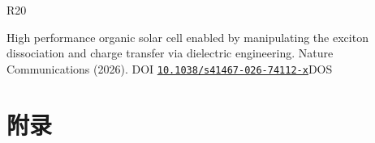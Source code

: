 \begin{thebibliography}{R20}
\par
 High performance organic solar cell enabled by manipulating the exciton dissociation and charge transfer via dielectric engineering. Nature Communications (2026). DOI \href{https://doi.org/10.1038/s41467-026-74112-x}{\nolinkurl{10.1038/s41467-026-74112-x}}\allowbreak{}DOS\allowbreak{}
\par
\end{thebibliography}
\medskip
\endgroup
\clearpage
\part*{{\cjkfont 附录}\allowbreak{} \allowbreak{}}
\FloatBarrier
\Needspace{110pt}
